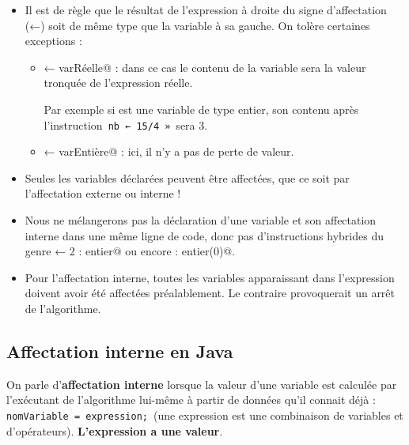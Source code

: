 \documentclass[11pt,a4paper]{article}
\begin{document}
					\begin{itemize}
				
			\item 
              Il est de r\`egle que le r\'esultat de l'expression \`a droite du signe d'affectation (←) soit de
              m\^eme type que la variable \`a sa gauche. On tol\`ere certaines exceptions :
              
					\begin{itemize}
				
			\item {} ← varRéelle@ : dans ce cas le contenu de la variable sera la valeur tronqu\'ee de l'expression r\'eelle. \par
				
                  Par exemple si \verb@nb@ est une variable de type entier,
                  son contenu apr\`es l'instruction \,\verb|nb ← 15/4 »|\, sera 3.
                
			\item {} ← varEntière@ : ici, il n'y a pas de perte de valeur.
					\end{itemize}
				
			\item 
            Seules les variables d\'eclar\'ees peuvent \^etre affect\'ees, que ce soit par l'affectation externe
            ou interne !
            
			\item 
            Nous ne m\'elangerons pas la d\'eclaration d'une variable et son affectation interne dans
            une m\^eme ligne de code, donc pas d'instructions hybrides du genre \verb@x ← 2 : entier@ ou
            encore \verb@x : entier(0)@.
            
			\item 
            Pour l'affectation interne, toutes les variables apparaissant dans l'expression doivent
            avoir \'et\'e affect\'ees pr\'ealablement. Le contraire provoquerait un arr\^et de l'algorithme.
            
					\end{itemize}
				
            \par
        \subsection{Affectation interne en Java}
          On parle d'\textbf{affectation interne} lorsque la valeur d'une variable est \guillemotleft  calcul\'ee \guillemotright  par l'ex\'ecutant
          de l'algorithme lui-m\^eme \`a partir de donn\'ees qu'il connait d\'ej\`a :
          \,\verb|nomVariable = expression;|\,
          (une expression est une combinaison de variables et d'op\'erateurs). \textbf{L'expression a une valeur}.
        
\end{document}
